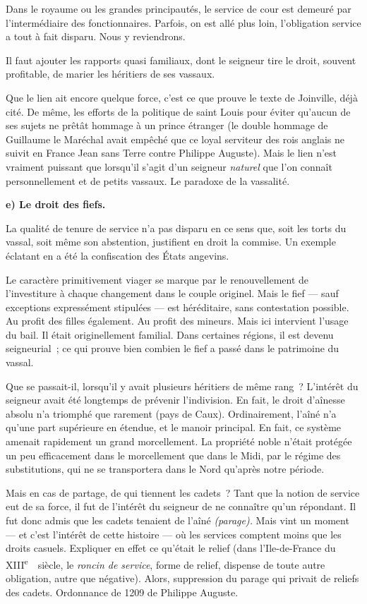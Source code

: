 \documentclass[french,twoside]{book} %
\newcommand{\labelchar}[1]{\textbf{\color{rubric} #1}}
\begin{document}
\noindent Dans le royaume ou les grandes principautés, le service de cour est demeuré par l’intermédiaire des fonctionnaires. Parfois, on est allé plus loin, l’obligation service a tout à fait disparu. Nous y reviendrons.\par
Il faut ajouter les rapports quasi familiaux, dont le seigneur tire le droit, souvent profitable, de marier les héritiers de ses vassaux.\par
Que le lien ait encore quelque force, c’est ce que prouve le texte de Joinville, déjà cité. De même, les efforts de la politique de saint Louis pour éviter qu’aucun de ses sujets ne prêtât hommage à un prince étranger (le double hommage de Guillaume le Maréchal avait empêché que ce loyal serviteur des rois anglais ne suivit en France Jean sans Terre contre Philippe Auguste). Mais le lien n’est vraiment puissant que lorsqu’il s’agit d’un seigneur \emph{naturel} que l’on connaît personnellement et de petits vassaux. Le paradoxe de la vassalité.\par
\bigbreak
\noindent \labelchar{e) Le droit des fiefs.}\par
La qualité de tenure de service n’a pas disparu en ce sens que, soit les torts du vassal, soit même son abstention, justifient en droit la commise. Un exemple éclatant en a été la confiscation des États angevins.\par
Le caractère primitivement viager se marque par le renouvellement de l’investiture à chaque changement dans le couple originel. Mais le fief — sauf exceptions expressément stipulées — est héréditaire, sans contestation possible. Au profit des filles également. Au profit des mineurs. Mais ici intervient l’usage du bail. Il était originellement familial. Dans certaines régions, il est devenu seigneurial ; ce qui prouve bien combien le fief a passé dans le patrimoine du vassal.\par
Que se passait-il, lorsqu’il y avait plusieurs héritiers de même rang ? L’intérêt du seigneur avait été longtemps de prévenir l’indivision. En fait, le droit d’aînesse absolu n’a triomphé que rarement (pays de Caux). Ordinairement, l’aîné n’a qu’une part supérieure en étendue, et le manoir principal. En fait, ce système amenait rapidement un grand morcellement. La propriété noble n’était protégée un peu efficacement dans le morcellement que dans le  
\label{p67} Midi, par le régime des substitutions, qui ne se transportera dans le Nord qu’après notre période.\par
Mais en cas de partage, de qui tiennent les cadets ? Tant que la notion de service eut de sa force, il fut de l’intérêt du seigneur de ne connaître qu’un répondant. Il fut donc admis que les cadets tenaient de l’aîné {\itshape (parage).} Mais vint un moment — et c’est l’intérêt de cette histoire — où les services comptent moins que les droits casuels. Expliquer en effet ce qu’était le relief (dans l’Ile-de-France du XIII\textsuperscript{e}  siècle, le \emph{roncin de service}, forme de relief, dispense de toute autre obligation, autre que négative). Alors, suppression du parage qui privait de reliefs des cadets. Ordonnance de 1209 de Philippe Auguste.\par
\end{document}
